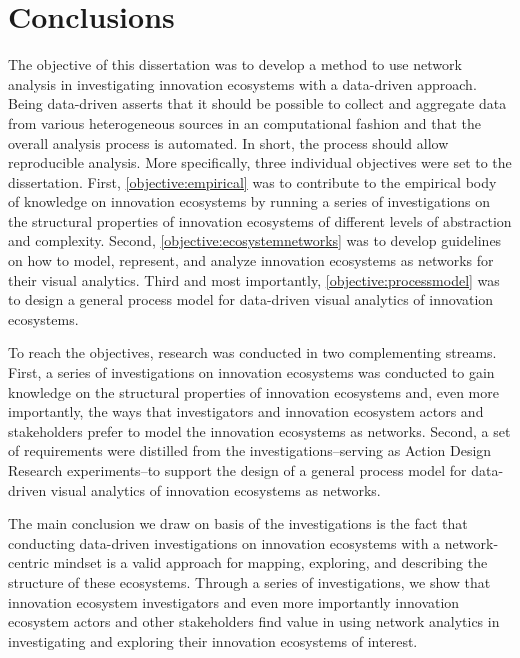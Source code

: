 \chapter{Conclusions}
\label{ch:conclusions}

The objective of this dissertation was to develop a method to use network analysis in investigating innovation ecosystems with a data-driven approach. Being data-driven asserts that it should be possible to collect and aggregate data from various heterogeneous sources in an computational fashion and that the overall analysis process is automated. In short, the process should allow reproducible analysis. More specifically, three individual objectives were set to the dissertation. First, \ref{objective:empirical} was to contribute to the empirical body of knowledge on innovation ecosystems by running a series of investigations on the structural properties of innovation ecosystems of different levels of abstraction and complexity. Second, \ref{objective:ecosystemnetworks} was to develop guidelines on how to model, represent, and analyze innovation ecosystems as networks for their visual analytics. Third and most importantly, \ref{objective:processmodel} was to design a general process model for data-driven visual analytics of innovation ecosystems.

To reach the objectives, research was conducted in two complementing streams. First, a series of investigations on innovation ecosystems was conducted to gain knowledge on the structural properties of innovation ecosystems and, even more importantly, the ways that investigators and innovation ecosystem actors and stakeholders prefer to model the innovation ecosystems as networks. Second, a set of requirements were distilled from the investigations--serving as Action Design Research \citep{Sein2011ActionResearch} experiments--to support the design of a general process model for data-driven visual analytics of innovation ecosystems as networks.

The main conclusion we draw on basis of the investigations is the fact that conducting data-driven investigations on innovation ecosystems with a network-centric mindset is a valid approach for mapping, exploring, and describing the structure of these ecosystems. Through a series of investigations, we show that innovation ecosystem investigators and even more importantly innovation ecosystem actors and other stakeholders find value in using network analytics in investigating and exploring their innovation ecosystems of interest.

